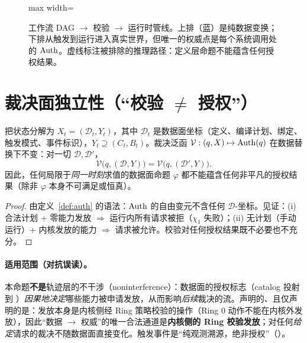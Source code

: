\begin{figure}[htbp]
\begin{adjustbox}{max width=\textwidth}
\end{adjustbox}
\caption{工作流 DAG $\rightarrow$ 校验 $\rightarrow$ 运行时管线。上排（蓝）是纯数据变换；下排从触发到运行进入真实世界，但唯一的权威点是每个系统调用处的 $\operatorname{Auth}$。虚线标注被排除的推理路径：定义层命题不能蕴含任何授权结果。}
\label{fig:workflow}
\end{figure}

\section{裁决面独立性（“校验 $\neq$ 授权”）}

\begin{proposition}\label{prop:verdictplane}
把状态分解为 $X_t=(\mathcal{D}_t,Y_t)$，其中 $\mathcal{D}_t$ 是数据面坐标（定义、编译计划、绑定、触发模式、事件标识），$Y_t\supseteq(C_t,B_t)$。裁决泛函 $\mathcal{V}:(q,X)\mapsto\operatorname{Auth}(q)$ 在数据替换下不变：对一切 $\mathcal{D},\mathcal{D}'$，
\begin{equation}
\mathcal{V}\bigl(q,(\mathcal{D},Y)\bigr)=\mathcal{V}\bigl(q,(\mathcal{D}',Y)\bigr).
\end{equation}
因此，任何局限于\emph{同一时刻}求值的数据面命题 $\varphi$ 都不能蕴含任何非平凡的授权结果（除非 $\varphi$ 本身不可满足或恒真）。
\end{proposition}
\begin{proof}
由定义~\ref{def:auth} 的语法：$\operatorname{Auth}$ 的自由变元不含任何 $\mathcal{D}$-坐标。见证：(i) 合法计划 + 零能力发放 $\Rightarrow$ 运行内所有请求被拒（$\chi_1$ 失败）；(ii) 无计划（手动运行）+ 内核发放的能力 $\Rightarrow$ 请求被允许。校验对任何授权结果既不必要也不充分。
\end{proof}

\paragraph{适用范围（对抗误读）。}
本命题\textbf{不是}轨迹层的不干涉（noninterference）：数据面的授权标志（catalog 投射到 ）\emph{因果地决定}哪些能力被申请发放，从而影响\emph{后续}裁决的流。声明的、且仅声明的是：发放本身是内核侧经 Ring 策略校验的操作（Ring 0 动作不能在内核外发放），因此“数据 $\to$ 权威”的唯一合法通道是\textbf{内核侧的 Ring 校验发放}；对任何\emph{给定}请求的裁决不随数据面直接变化。触发事件是“纯观测溯源，绝非授权”（）。

